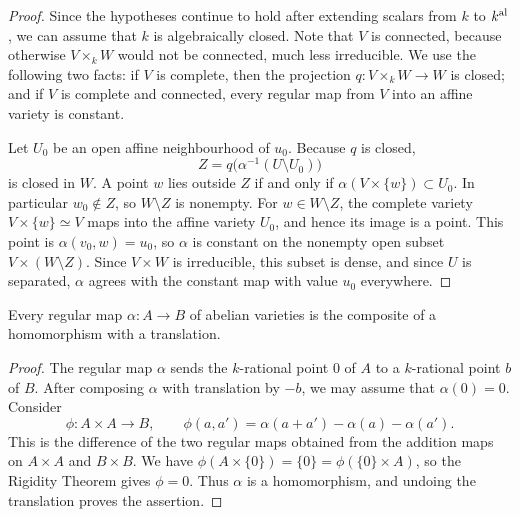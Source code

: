 \begin{proof}

\leanok

Since the hypotheses continue to hold after extending scalars from $k$ to
$k^{\rm al}$, we can assume that $k$ is algebraically closed.  Note that $V$
is connected, because otherwise $V\times_k W$ would not be connected, much
less irreducible.  We use the following two facts: if $V$ is complete, then
the projection $q:V\times_kW\to W$ is closed; and if $V$ is complete and
connected, every regular map from $V$ into an affine variety is constant.

Let $U_0$ be an open affine neighbourhood of $u_0$.  Because $q$ is closed,
\[
 Z=q\bigl(\alpha^{-1}(U\setminus U_0)\bigr)
\]
is closed in $W$.  A point $w$ lies outside $Z$ if and only if
$\alpha(V\times\{w\})\subset U_0$.  In particular $w_0\notin Z$, so
$W\setminus Z$ is nonempty.  For $w\in W\setminus Z$, the complete variety
$V\times\{w\}\simeq V$ maps into the affine variety $U_0$, and hence its image
is a point.  This point is $\alpha(v_0,w)=u_0$, so $\alpha$ is constant on the
nonempty open subset $V\times(W\setminus Z)$.  Since $V\times W$ is
irreducible, this subset is dense, and since $U$ is separated, $\alpha$ agrees
with the constant map with value $u_0$ everywhere.

\end{proof}


\begin{corollary}
\label{cor:milne-morphism-translation-homomorphism}

Every regular map $\alpha:A\to B$ of abelian varieties is the composite of a
homomorphism with a translation.
\end{corollary}

\begin{proof}
The regular map $\alpha$ sends the $k$-rational point $0$ of $A$ to a
$k$-rational point $b$ of $B$.  After composing $\alpha$ with translation by
$-b$, we may assume that $\alpha(0)=0$.  Consider
\[
 \phi:A\times A\longrightarrow B,\qquad
 \phi(a,a')=\alpha(a+a')-\alpha(a)-\alpha(a').
\]
This is the difference of the two regular maps obtained from the addition maps
on $A\times A$ and $B\times B$.  We have
$\phi(A\times\{0\})=\{0\}=\phi(\{0\}\times A)$, so the Rigidity Theorem
gives $\phi=0$.  Thus $\alpha$ is a homomorphism, and undoing the translation
proves the assertion.
\end{proof}

